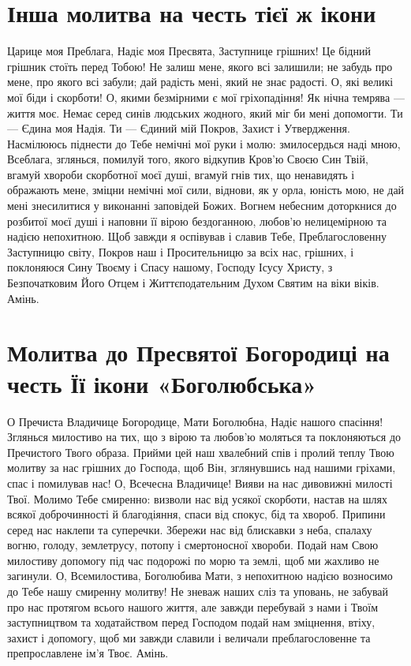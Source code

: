 \documentclass[chapters.tex]{subfiles}
\begin{document}
\section{Інша молитва на честь тієї ж ікони}
Царице моя Преблага, Надіє моя Пресвята, Заступнице грішних! Це бідний грішник стоїть перед Тобою! Не залиш мене, якого всі залишили; не забудь про мене, про якого всі забули; дай радість мені, який не знає радості. О, які великі мої біди і скорботи! О, якими безмірними є мої гріхопадіння! Як нічна темрява — життя моє. Немає серед синів людських жодного, який міг би мені допомогти. Ти — Єдина моя Надія. Ти — Єдиний мій Покров, Захист і Утвердження. Насмілююсь піднести до Тебе немічні мої руки і молю: змилосердься наді мною, Всеблага, зглянься, помилуй того, якого відкупив Кров’ю Своєю Син Твій, вгамуй хвороби скорботної моєї душі, вгамуй гнів тих, що ненавидять і ображають мене, зміцни немічні мої сили, віднови, як у орла, юність мою, не дай мені знесилитися у виконанні заповідей Божих. Вогнем небесним доторкнися до розбитої моєї душі і наповни її вірою бездоганною, любов’ю нелицемірною та надією непохитною. Щоб завжди я оспівував і славив Тебе, Преблагословенну Заступницю світу, Покров наш і Просительницю за всіх нас, грішних, і поклоняюся Сину Твоєму і Спасу нашому, Господу Ісусу Христу, з Безпочатковим Його Отцем і Життєподательним Духом Святим на віки віків. Амінь.

\section{Молитва до Пресвятої Богородиці на честь Її ікони «Боголюбська»}
О Пречиста Владичице Богородице, Мати Боголюбна, Надіє нашого спасіння! Зглянься милостиво на тих, що з вірою та любов’ю моляться та поклоняються до Пречистого Твого образа. Прийми цей наш хвалебний спів і пролий теплу Твою молитву за нас грішних до Господа, щоб Він, зглянувшись над нашими гріхами, спас і помилував нас! О, Всечесна Владичице! Вияви на нас дивовижні милості Твої. Молимо Тебе смиренно: визволи нас від усякої скорботи, настав на шлях всякої доброчинності й благодіяння, спаси від спокус, бід та хвороб. Припини серед нас наклепи та суперечки. Збережи нас від блискавки з неба, спалаху вогню, голоду, землетрусу, потопу і смертоносної хвороби. Подай нам Свою милостиву допомогу під час подорожі по морю та землі, щоб ми жахливо не загинули. О, Всемилостива, Боголюбива Мати, з непохитною надією возносимо до Тебе нашу смиренну молитву! Не зневаж наших сліз та уповань, не забувай про нас протягом всього нашого життя, але завжди перебувай з нами і Твоїм заступництвом та ходатайством перед Господом подай нам зміцнення, втіху, захист і допомогу, щоб ми завжди славили і величали преблагословенне та препрославлене ім’я Твоє. Амінь.
\end{document}
